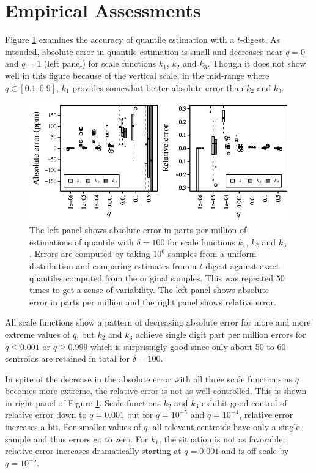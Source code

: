 \documentclass[]{statsoc}
\begin{document}
\section{Empirical Assessments}
Figure \ref{fig:by-scale} examines the accuracy of quantile estimation with a $t$-digest.  As intended, absolute error in quantile estimation is small and decreases near $q=0$ and $q=1$ (left panel) for scale functions $k_1$, $k_2$ and $k_3$. Though it does not show well in this figure because of the vertical scale, in the mid-range where $q \in [0.1, 0.9]$, $k_1$ provides somewhat better absolute error than $k_2$ and $k_3$. 
\begin{figure}[htb] %
   \includegraphics[width=5.5in]{figures/relative-error.pdf} 
   \caption{The left panel shows absolute error in parts per million of estimations of quantile with $\delta = 100$ for scale functions $k_1$, $k_2$ and $k_3$. Errors are computed by taking $10^6$ samples from a uniform distribution and comparing estimates from a $t$-digest against exact quantiles computed from the original samples. This was repeated 50 times to get a sense of variability. The left panel shows absolute error in parts per million and the right panel shows relative error.}
   \label{fig:by-scale}
\end{figure}

All scale functions show a pattern of decreasing absolute error for more and more extreme values of $q$, but $k_2$ and $k_3$ achieve single digit part per million errors for $q\le 0.001$ or $q\ge0.999$ which is surprisingly good since only about 50 to 60 centroids are retained in total for $\delta=100$. 

In spite of the decrease in the absolute error with all three scale functions as $q$ becomes more extreme, the relative error is not as well controlled. This is shown in right panel of Figure \ref{fig:by-scale}. Scale functions $k_2$ and $k_3$ exhibit good control of relative error down to $q=0.001$ but for $q= 10^{-5}$ and $q=10^{-4}$, relative error increases a bit. For  smaller values of $q$, all relevant centroids have only a single sample and thus errors go to zero. For $k_1$, the situation is not as favorable; relative error increases dramatically starting at $q=0.001$ and is off scale by $q=10^{-5}$.
\end{document}
